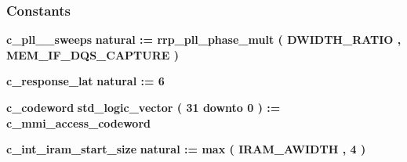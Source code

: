 \subsubsection*{Constants}
 \begin{DoxyCompactItemize}
\item 
{\bf c\+\_\+pll\+\_\+\_\+sweeps} {\bfseries \textcolor{comment}{natural}\textcolor{vhdlchar}{ }\textcolor{vhdlchar}{ }\textcolor{vhdlchar}{\+:}\textcolor{vhdlchar}{=}\textcolor{vhdlchar}{ }\textcolor{vhdlchar}{ }\textcolor{vhdlchar}{ }\textcolor{vhdlchar}{ }\textcolor{vhdlchar}{rrp\+\_\+pll\+\_\+phase\+\_\+mult}\textcolor{vhdlchar}{ }\textcolor{vhdlchar}{(}\textcolor{vhdlchar}{ }\textcolor{vhdlchar}{ }\textcolor{vhdlchar}{ }\textcolor{vhdlchar}{ }{\bfseries {\bf D\+W\+I\+D\+T\+H\+\_\+\+R\+A\+T\+IO}} \textcolor{vhdlchar}{ }\textcolor{vhdlchar}{,}\textcolor{vhdlchar}{ }\textcolor{vhdlchar}{ }\textcolor{vhdlchar}{ }\textcolor{vhdlchar}{ }{\bfseries {\bf M\+E\+M\+\_\+\+I\+F\+\_\+\+D\+Q\+S\+\_\+\+C\+A\+P\+T\+U\+RE}} \textcolor{vhdlchar}{ }\textcolor{vhdlchar}{)}\textcolor{vhdlchar}{ }} 
\item 
{\bf c\+\_\+response\+\_\+lat} {\bfseries \textcolor{comment}{natural}\textcolor{vhdlchar}{ }\textcolor{vhdlchar}{ }\textcolor{vhdlchar}{\+:}\textcolor{vhdlchar}{=}\textcolor{vhdlchar}{ }\textcolor{vhdlchar}{ } \textcolor{vhdldigit}{6} \textcolor{vhdlchar}{ }} 
\item 
{\bf c\+\_\+codeword} {\bfseries \textcolor{comment}{std\+\_\+logic\+\_\+vector}\textcolor{vhdlchar}{ }\textcolor{vhdlchar}{(}\textcolor{vhdlchar}{ }\textcolor{vhdlchar}{ } \textcolor{vhdldigit}{31} \textcolor{vhdlchar}{ }\textcolor{keywordflow}{downto}\textcolor{vhdlchar}{ }\textcolor{vhdlchar}{ } \textcolor{vhdldigit}{0} \textcolor{vhdlchar}{ }\textcolor{vhdlchar}{)}\textcolor{vhdlchar}{ }\textcolor{vhdlchar}{ }\textcolor{vhdlchar}{ }\textcolor{vhdlchar}{\+:}\textcolor{vhdlchar}{=}\textcolor{vhdlchar}{ }\textcolor{vhdlchar}{ }\textcolor{vhdlchar}{ }\textcolor{vhdlchar}{ }\textcolor{vhdlchar}{c\+\_\+mmi\+\_\+access\+\_\+codeword}\textcolor{vhdlchar}{ }} 
\item 
{\bf c\+\_\+int\+\_\+iram\+\_\+start\+\_\+size} {\bfseries \textcolor{comment}{natural}\textcolor{vhdlchar}{ }\textcolor{vhdlchar}{ }\textcolor{vhdlchar}{\+:}\textcolor{vhdlchar}{=}\textcolor{vhdlchar}{ }\textcolor{vhdlchar}{ }\textcolor{vhdlchar}{ }\textcolor{vhdlchar}{ }\textcolor{vhdlchar}{max}\textcolor{vhdlchar}{ }\textcolor{vhdlchar}{(}\textcolor{vhdlchar}{ }\textcolor{vhdlchar}{ }\textcolor{vhdlchar}{ }\textcolor{vhdlchar}{ }{\bfseries {\bf I\+R\+A\+M\+\_\+\+A\+W\+I\+D\+TH}} \textcolor{vhdlchar}{ }\textcolor{vhdlchar}{,}\textcolor{vhdlchar}{ }\textcolor{vhdlchar}{ } \textcolor{vhdldigit}{4} \textcolor{vhdlchar}{ }\textcolor{vhdlchar}{)}\textcolor{vhdlchar}{ }} 

\end{DoxyCompactItemize}

